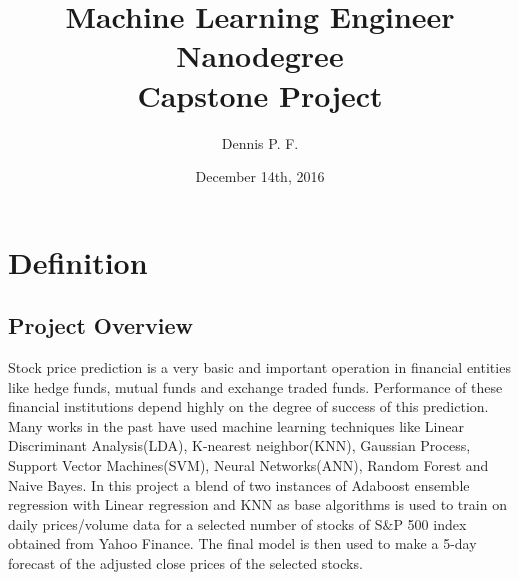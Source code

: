 \documentclass[10pt]{report}
\begin{document}
\title{%
  Machine Learning Engineer Nanodegree \\
  \large Capstone Project}
\author{Dennis P. F.}
\date{December 14th, 2016}
\maketitle

\section{Definition}
\subsection*{Project Overview}
Stock price prediction is a very basic and important operation in financial entities like hedge funds, mutual funds and exchange traded funds. Performance of these financial institutions depend highly on the degree of success of this prediction. Many works in the past have used machine learning techniques like Linear Discriminant Analysis(LDA), K-nearest neighbor(KNN), Gaussian Process, Support Vector Machines(SVM), Neural Networks(ANN), Random Forest and Naive Bayes\cite{Ou2009}\cite{Patel2015}. In this project a blend of two instances of Adaboost ensemble regression with Linear regression and KNN as base algorithms is used to train on daily prices/volume data for a selected number of stocks of S\&P 500\cite{sp500} index obtained from Yahoo Finance. The final model is then used to make a 5-day forecast of the adjusted close prices\cite{adjclose} of the selected stocks.
\end{document}
